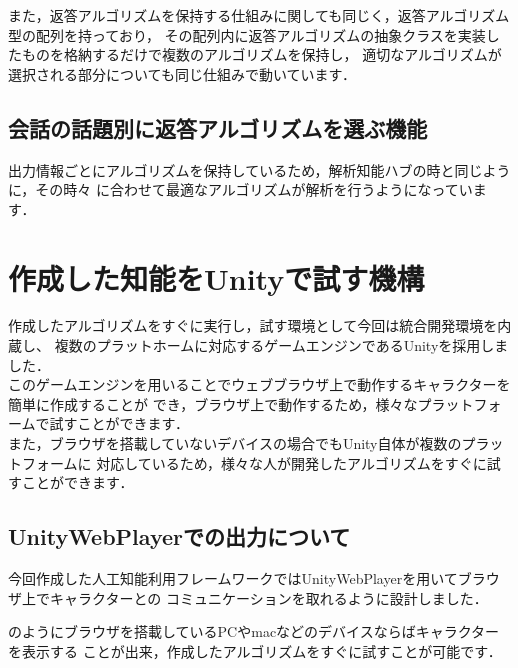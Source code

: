 また，返答アルゴリズムを保持する仕組みに関しても同じく，返答アルゴリズム型の配列を持っており，
その配列内に返答アルゴリズムの抽象クラスを実装したものを格納するだけで複数のアルゴリズムを保持し，
適切なアルゴリズムが選択される部分についても同じ仕組みで動いています．\\

\subsection{会話の話題別に返答アルゴリズムを選ぶ機能}
出力情報ごとにアルゴリズムを保持しているため，解析知能ハブの時と同じように，その時々
に合わせて最適なアルゴリズムが解析を行うようになっています．


\newpage


\section{作成した知能をUnityで試す機構}
作成したアルゴリズムをすぐに実行し，試す環境として今回は統合開発環境を内蔵し、
複数のプラットホームに対応するゲームエンジンであるUnityを採用しました．\\

このゲームエンジンを用いることでウェブブラウザ上で動作するキャラクターを簡単に作成することが
でき，ブラウザ上で動作するため，様々なプラットフォームで試すことができます．\\

また，ブラウザを搭載していないデバイスの場合でもUnity自体が複数のプラットフォームに
対応しているため，様々な人が開発したアルゴリズムをすぐに試すことができます．\\

\subsection{UnityWebPlayerでの出力について}
今回作成した人工知能利用フレームワークではUnityWebPlayerを用いてブラウザ上でキャラクターとの
コミュニケーションを取れるように設計しました．\\


のようにブラウザを搭載しているPCやmacなどのデバイスならばキャラクターを表示する
ことが出来，作成したアルゴリズムをすぐに試すことが可能です．\\


